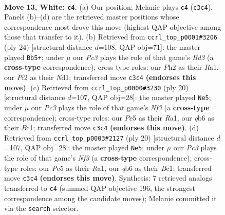 \documentclass[11pt]{article}
\begin{document}
\clearpage

\begin{figure}[p]\centering
\begin{subfigure}{0.46\textwidth}\centering
\resizebox{\linewidth}{!}{%
\newchessgame
\chessboard[
  setfen={r3k1nr/1p1b4/1qn1p3/p1bpPp1p/6p1/P1P5/1P1NQPPP/R1B1KBNR w Kkq - 0 13},
  showmover=false,
  pgfstyle=straightmove, color=movearrow, markmove={c3-c4}
]}
\caption{}
\end{subfigure}\hfill
\begin{subfigure}{0.46\textwidth}\centering
\resizebox{\linewidth}{!}{%
\newchessgame
\chessboard[
  setfen={rnb1k2r/2q1bppp/3ppn2/p7/Pp2PP2/1N1B4/1PPBQ1PP/R2NK2R w KQkq - 0 13},
  showmover=false,
  pgfstyle=straightmove, color=movearrow, markmove={d3-b5}
]}
\caption{}
\end{subfigure}
\\[4pt]
\begin{subfigure}{0.46\textwidth}\centering
\resizebox{\linewidth}{!}{%
\newchessgame
\chessboard[
  setfen={rn2kb1r/pb3ppp/4pn2/q1p5/Np1PP3/1P1Q1N2/P4PPP/R1B1KB1R w KQkq - 0 11},
  showmover=false,
  pgfstyle=straightmove, color=movearrow, markmove={f3-e5}
]}
\caption{}
\end{subfigure}\hfill
\begin{subfigure}{0.46\textwidth}\centering
\resizebox{\linewidth}{!}{%
\newchessgame
\chessboard[
  setfen={rn2kb1r/pb3ppp/4pn2/q1p5/Np1PP3/1P1Q1N2/P4PPP/R1B1KB1R w KQkq - 0 11},
  showmover=false,
  pgfstyle=straightmove, color=movearrow, markmove={f3-e5}
]}
\caption{}
\end{subfigure}
\caption{\textbf{Move 13, White: \texttt{c4}.} (a) Our position; Melanie plays \texttt{c4} (\texttt{c3c4}). Panels (b)--(d) are the retrieved master positions whose correspondence most drove this move (highest QAP objective among those that transfer to it). (b) Retrieved from \texttt{ccrl\_top\_p0001\#3206} (ply 24) [structural distance $d$=108, QAP obj=71]: the master played \texttt{Bb5+}; under $\mu$ our \emph{Pc3} plays the role of that game's \emph{Bd3} (a \textbf{cross-type} correspondence); cross-type roles: our \emph{P}h2 as their \emph{R}a1, our \emph{P}f2 as their \emph{N}d1; transferred move \texttt{c3c4} \textbf{(endorses this move)}. (c) Retrieved from \texttt{ccrl\_top\_p0000\#3230} (ply 20) [structural distance $d$=107, QAP obj=28]: the master played \texttt{Ne5}; under $\mu$ our \emph{Pc3} plays the role of that game's \emph{Nf3} (a \textbf{cross-type} correspondence); cross-type roles: our \emph{P}e5 as their \emph{R}a1, our \emph{q}b6 as their \emph{B}c1; transferred move \texttt{c3c4} \textbf{(endorses this move)}. (d) Retrieved from \texttt{ccrl\_top\_p0003\#2127} (ply 20) [structural distance $d$=107, QAP obj=28]: the master played \texttt{Ne5}; under $\mu$ our \emph{Pc3} plays the role of that game's \emph{Nf3} (a \textbf{cross-type} correspondence); cross-type roles: our \emph{P}e5 as their \emph{R}a1, our \emph{q}b6 as their \emph{B}c1; transferred move \texttt{c3c4} \textbf{(endorses this move)}. Synthesis: 7 retrieved analogs transferred to \texttt{c4} (summed QAP objective 196, the strongest correspondence among the candidate moves); Melanie committed it via the \texttt{search} selector.}

\end{figure}
\end{document}
